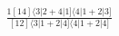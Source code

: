 \documentclass[varwidth, border=5pt]{standalone}
\begin{document}
\begin{my}
$\begin{gathered}
\scriptscriptstyle\frac{1[14]⟨3|2+4|1]⟨4|1+2|3]}{[12]⟨3|1+2|4]⟨4|1+2|4]}
\end{gathered}$
\end{my}
\end{document}
